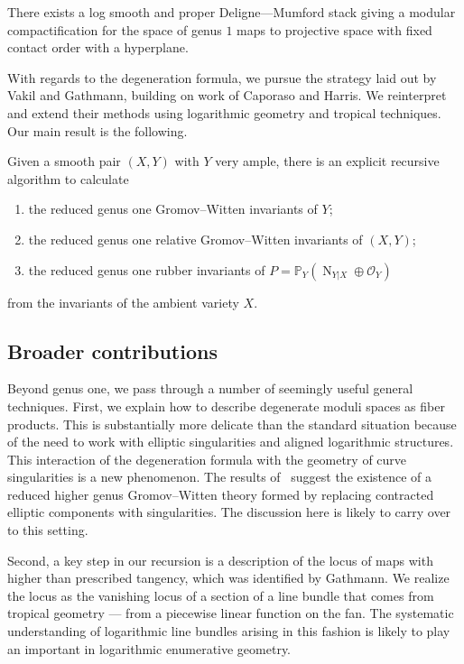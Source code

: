 \documentclass[11pt]{amsart}
\newcommand{\PP}{\mathbb P}
\newcommand{\OO}{\mathcal{O}}
\theoremstyle{definition}
\newenvironment{customthm}[1]
  {\renewcommand\theinnercustomthm{#1}\innercustomthm}
  {\endinnercustomthm}
\theoremstyle{definition}
\begin{document}
\begin{customthm}{A}
There exists a log smooth and proper Deligne—Mumford stack giving a modular compactification for the space of genus $1$ maps to projective space with fixed contact order with a hyperplane. 
\end{customthm}

With regards to the degeneration formula, we pursue the strategy laid out by Vakil and Gathmann, building on work of Caporaso and Harris. We reinterpret and extend their methods using logarithmic geometry and tropical techniques. Our main result is the following.

\begin{customthm}{B}
Given a smooth pair $(X,Y)$ with $Y$ very ample, there is an explicit recursive algorithm to calculate
\begin{enumerate}
\item the reduced genus one Gromov--Witten invariants of $Y$;
\item the reduced genus one relative Gromov--Witten invariants of $(X,Y)$; 
\item the reduced genus one rubber invariants of $P=\PP_Y(\operatorname{N}_{Y|X} \oplus \OO_Y)$
\end{enumerate}
from the invariants of the ambient variety $X$.
\end{customthm}

\subsection{Broader contributions} Beyond genus one, we pass through a number of seemingly useful general techniques. First, we explain how to describe degenerate moduli spaces as fiber products. This is substantially more delicate than the standard situation because of the need to work with elliptic singularities and aligned logarithmic structures. This interaction of the degeneration formula with the geometry of curve singularities is a new phenomenon. The results of~\cite{RSPW} suggest the existence of a reduced higher genus Gromov--Witten theory formed by replacing contracted elliptic components with singularities. The discussion here is likely to carry over to this setting.

Second, a key step in our recursion is a description of the locus of maps with higher than prescribed tangency, which was identified by Gathmann. We realize the locus as the vanishing locus of a section of a line bundle that comes from tropical geometry — from a piecewise linear function on the fan. The systematic understanding of logarithmic line bundles arising in this fashion is likely to play an important in logarithmic enumerative geometry.
\end{document}
